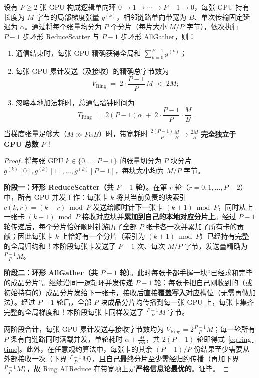 \begin{thmBox}
\begin{theorem}
\label{thm:ring-allreduce}
设有 $P \ge 2$ 张 GPU 构成逻辑单向环 $0 \to 1 \to \cdots \to P-1 \to 0$，每张 GPU 持有长度为 $M$ 字节的局部梯度张量 $g^{(k)}$，相邻链路单向带宽为 $B$、单次传输固定延迟为 $\alpha$。通过将每个张量均分为 $P$ 个分片（每片大小 $M/P$ 字节），依次执行 $P-1$ 步环形 ReduceScatter 与 $P-1$ 步环形 AllGather，则：
\begin{enumerate}
  \item 通信结束时，每张 GPU 精确获得全局和 $\sum_{k=0}^{P-1} g^{(k)}$；
  \item 每张 GPU 累计发送（及接收）的精确总字节数为
  \begin{equation}
    V_{\mathrm{Ring}} \;=\; 2 \cdot \frac{P - 1}{P}\, M \;<\; 2 M;
    \label{eq:ring-vol}
  \end{equation}
  \item 忽略本地加法耗时，总通信墙钟时间为
  \begin{equation}
    T_{\mathrm{Ring}} \;=\; 2(P - 1)\alpha \;+\; 2 \cdot \frac{P - 1}{P} \cdot \frac{M}{B}.
    \label{eq:ring-time}
  \end{equation}
\end{enumerate}
当梯度张量足够大（$M \gg P \alpha B$）时，带宽耗时 $\frac{2(P-1)}{P}\frac{M}{B} \to \frac{2M}{B}$ \textbf{完全独立于 GPU 总数 $P$}！
\end{theorem}
\end{thmBox}

\begin{proof}
将每张 GPU $k \in \{0, \dots, P-1\}$ 的张量切分为 $P$ 块分片 $g^{(k)}[0], g^{(k)}[1], \dots, g^{(k)}[P-1]$，每块大小均为 $M/P$ 字节。

\textbf{阶段一：环形 ReduceScatter（共 $P-1$ 轮）}。在第 $r$ 轮（$r = 0, 1, \dots, P-2$）中，所有 GPU 并发工作：每张卡 $k$ 将其当前负责的块索引 $c(k, r) = (k - r) \bmod P$ 发送给顺时针下一张卡 $(k+1)\bmod P$，同时从上一张卡 $(k-1)\bmod P$ 接收对应块并\textbf{累加到自己的本地对应分片上}。经过 $P-1$ 轮传递后，每个分片恰好顺时针游历了全部 $P$ 张卡各一次并累加了所有卡的贡献；因此每张卡 $k$ 上恰好有一个分片（索引为 $(k+1)\bmod P$）已经持有完整的全局归约和！本阶段每张卡发送了 $P-1$ 次、每次 $M/P$ 字节，发送量精确为 $\frac{P-1}{P}M$。

\textbf{阶段二：环形 AllGather（共 $P-1$ 轮）}。此时每张卡都手握一块“已经求和完毕的成品分片”。继续沿同一逻辑环并发传递 $P-1$ 轮：每张卡把自己刚收到的（或初始持有的）成品分片发给下一张卡，接收后直接\textbf{覆盖写入}对应槽位（无需再做加法）。经过 $P-1$ 轮后，全部 $P$ 块成品分片均传播到每一张 GPU 上，每张卡集齐完整的全局梯度和！本阶段每张卡同样发送了 $\frac{P-1}{P}M$ 字节。

两阶段合计，每张 GPU 累计发送与接收字节数均为 $V_{\mathrm{Ring}} = 2\frac{P-1}{P}M$；每一轮所有 $P$ 条有向链路同时满载并发，单轮耗时 $\alpha + \frac{M}{PB}$，共 $2(P-1)$ 轮即得式~\eqref{eq:ring-time}。此外，在任意规约算法中，每张卡的其余 $(P-1)/P$ 份结果至少需要从外部接收一次（下界 $\frac{P-1}{P}M$），且自己最终分片至少需经归约传播（再加下界 $\frac{P-1}{P}M$），故 Ring AllReduce 在带宽项上是\textbf{严格信息论最优的}。证毕。
\end{proof}

